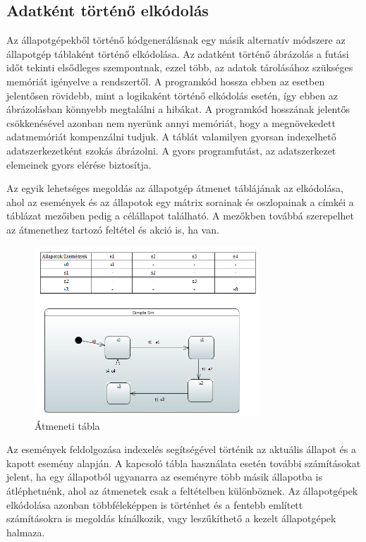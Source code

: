 \documentclass[a4paper,12pt]{report}
\begin{document}
\subsection{Adatként történő elkódolás}

Az állapotgépekből történő kódgenerálásnak egy másik alternatív módszere az állapotgép táblaként történő elkódolása\cite{pilitowski2007code}.
Az adatként történő ábrázolás a futási időt tekinti elsődleges szempontnak, ezzel több, az adatok tárolásához szükséges memóriát igényelve a rendszertől. A programkód hossza ebben az esetben jelentősen rövidebb, mint a logikaként történő elkódolás esetén, így ebben az ábrázolásban könnyebb megtalálni a hibákat. A programkód hosszának jelentős csökkenésével azonban nem nyerünk annyi memóriát, hogy a megnövekedett adatmemóriát kompenzálni tudjuk. A táblát valamilyen gyorsan indexelhető adatszerkezetként szokás ábrázolni. A gyors programfutást, az adatszerkezet elemeinek gyors elérése biztosítja.

Az egyik lehetséges megoldás az állapotgép átmenet táblájának az elkódolása, ahol az események és az állapotok egy mátrix sorainak és oszlopainak a címkéi a táblázat mezőiben pedig a célállapot található. A mezőkben továbbá szerepelhet az átmenethez tartozó feltétel és akció is, ha van.

\begin{figure}[hbtp]
\centering
\includegraphics[width=0.75\textwidth]{smtable.png}
\caption{Átmeneti tábla}
\label{fig:at}
\end{figure}

Az események feldolgozása indexelés segítségével történik az aktuális állapot és a kapott esemény alapján. A kapcsoló tábla használata esetén további számításokat jelent, ha egy állapotból ugyanarra az eseményre több másik állapotba is átléphetnénk, ahol az átmenetek csak a feltételben különböznek. Az állapotgépek elkódolása azonban többféleképpen is történhet és a fentebb említett számításokra is megoldás kínálkozik, vagy leszűkíthető a kezelt állapotgépek halmaza.
\end{document}
